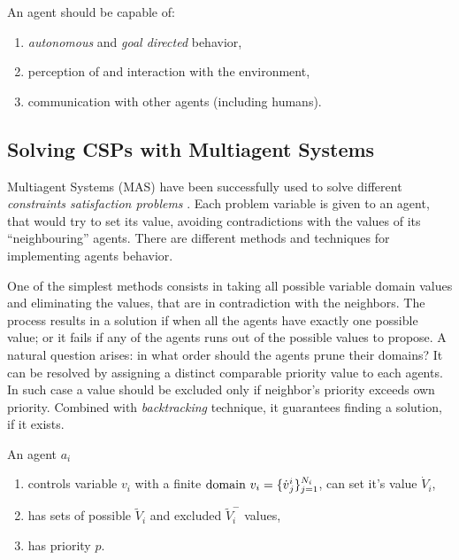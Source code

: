 \bigskip

\noindent
An agent should be capable of:
\begin{enumerate}
  \item \emph{autonomous} and \emph{goal directed} behavior,
  \item perception of and interaction with the environment,
  \item communication with other agents (including humans).
\end{enumerate}

\todo{}

\subsection{Solving CSPs with Multiagent Systems}
\medskip

Multiagent Systems (MAS) have been successfully used to solve
different \emph{constraints satisfaction problems} \cite{MAS, MAS-Survey}.
Each problem variable is given to an agent, that would try to set its value,
avoiding contradictions with the values of its ``neighbouring'' agents.
There are different methods and techniques for implementing agents behavior.

One of the simplest methods consists in taking all possible variable domain values
and eliminating the values, that are in contradiction with the neighbors.
The process results in a solution if when all the agents have exactly one
possible value; or it fails if any of the agents runs out of the possible
values to propose. A natural question arises: in what order should the agents
prune their domains?
It can be resolved by assigning a distinct comparable priority value to each agents.
In such case a value should be excluded only if neighbor's priority exceeds own priority.
Combined with \emph{backtracking} technique, it guarantees finding a solution,
if it exists.

\noindent
An agent $a_i$
\begin{enumerate}
  \item controls variable $v_i$ with a finite $\mathrm{domain}~v_i =
        \{{\dot v}^i_j\}_{j=1}^{N_i}$, can set it's value ${\dot V}_i$,
  \item has sets of possible ${\tilde V}_i$ and excluded ${\tilde V}_i^-$ values,
  \item has priority $p$.
\end{enumerate}

